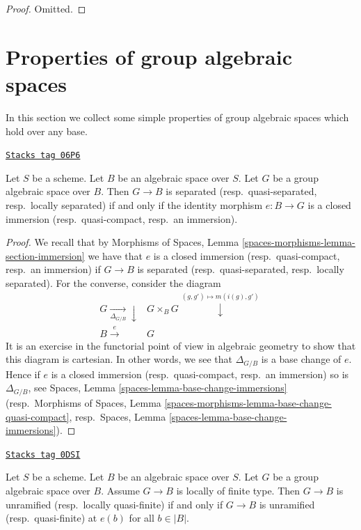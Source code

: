 \begin{proof}
Omitted.
\end{proof}

\section{Properties of group algebraic spaces}
\label{spaces-groupoids-section-properties-group-spaces}
In this section we collect some simple properties of group algebraic spaces
which hold over any base.

\begin{lemma}
\label{spaces-groupoids-lemma-group-scheme-separated}
\href{https://stacks.math.columbia.edu/tag/06P6}{\texttt{Stacks tag 06P6}}

Let $S$ be a scheme. Let $B$ be an algebraic space over $S$.
Let $G$ be a group algebraic space over $B$.
Then $G \to B$ is separated (resp.\ quasi-separated, resp.\ locally separated)
if and only if the identity morphism $e : B \to G$ is a closed immersion
(resp.\ quasi-compact, resp.\ an immersion).
\end{lemma}

\begin{proof}
We recall that by
Morphisms of Spaces, Lemma \ref{spaces-morphisms-lemma-section-immersion}
we have that $e$ is a closed immersion (resp.\ quasi-compact, resp.\ an
immersion) if $G \to B$ is separated (resp.\ quasi-separated, resp.\ locally
separated).
For the converse, consider the diagram
$$
\begin{array}{cc}G \underset{\Delta_{G/B}}{\longrightarrow}\downarrow & G \times_B G \overset{(g, g') \mapsto m(i(g), g')}{\downarrow} \\ B \overset{e}{\longrightarrow} & G\end{array}
$$
It is an exercise in the functorial point of view in algebraic geometry
to show that this diagram is cartesian. In other words, we see that
$\Delta_{G/B}$ is a base change of $e$. Hence if $e$ is a
closed immersion (resp.\ quasi-compact, resp.\ an immersion) so is
$\Delta_{G/B}$, see
Spaces, Lemma \ref{spaces-lemma-base-change-immersions}
(resp.\ Morphisms of Spaces, Lemma
\ref{spaces-morphisms-lemma-base-change-quasi-compact},
resp.\ Spaces, Lemma \ref{spaces-lemma-base-change-immersions}).
\end{proof}

\begin{lemma}
\label{spaces-groupoids-lemma-group-scheme-unramified-or-lqf}
\href{https://stacks.math.columbia.edu/tag/0DSI}{\texttt{Stacks tag 0DSI}}

Let $S$ be a scheme. Let $B$ be an algebraic space over $S$.
Let $G$ be a group algebraic space over $B$. Assume $G \to B$
is locally of finite type. Then
$G \to B$ is unramified (resp.\ locally quasi-finite)
if and only if $G \to B$ is unramified (resp.\ quasi-finite)
at $e(b)$ for all $b \in |B|$.
\end{lemma}

